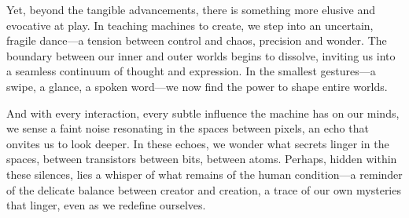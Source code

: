 Yet, beyond the tangible advancements, there is something more elusive and evocative at play.
In teaching machines to create, we step into an uncertain, fragile dance—a tension between control and chaos, precision and wonder.
The boundary between our inner and outer worlds begins to dissolve, inviting us into a seamless continuum of thought and expression.
In the smallest gestures—a swipe, a glance, a spoken word—we now find the power to shape entire worlds.

And with every interaction, every subtle influence the machine has on our minds, we sense a faint noise resonating in the spaces between pixels, an echo that onvites us to look deeper.
In these echoes, we wonder what secrets linger in the spaces, between transistors between bits, between atoms.
Perhaps, hidden within these silences, lies a whisper of what remains of the human condition—a reminder of the delicate balance between creator and creation, a trace of our own mysteries that linger, even as we redefine ourselves.